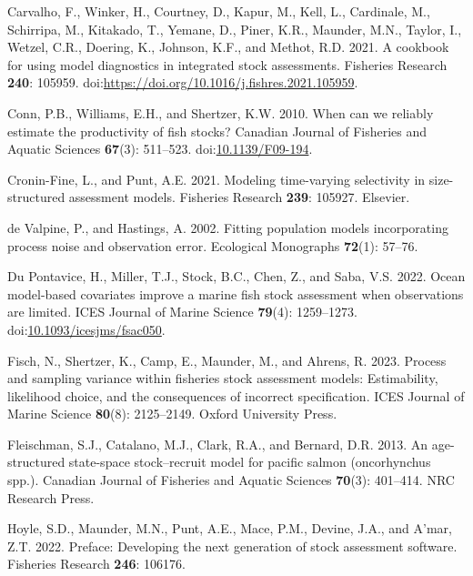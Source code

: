 \documentclass[
  12pt,
]{article}
\newlength{\cslhangindent}
\newlength{\cslentryspacingunit} %
\newenvironment{CSLReferences}[2] %
 {%
  \setlength{\parindent}{0pt}
  \ifodd #1
  \let\oldpar\par
  \def\par{\hangindent=\cslhangindent\oldpar}
  \fi
  \setlength{\parskip}{#2\cslentryspacingunit}
 }%
 {}
\begin{document}
\begin{CSLReferences}{1}{0}
\leavevmode{}%
Carvalho, F., Winker, H., Courtney, D., Kapur, M., Kell, L., Cardinale,
M., Schirripa, M., Kitakado, T., Yemane, D., Piner, K.R., Maunder, M.N.,
Taylor, I., Wetzel, C.R., Doering, K., Johnson, K.F., and Methot, R.D.
2021. A cookbook for using model diagnostics in integrated stock
assessments. Fisheries Research \textbf{240}: 105959.
doi:\url{https://doi.org/10.1016/j.fishres.2021.105959}.

\leavevmode{}%
Conn, P.B., Williams, E.H., and Shertzer, K.W. 2010. When can we
reliably estimate the productivity of fish stocks? Canadian Journal of
Fisheries and Aquatic Sciences \textbf{67}(3): 511--523.
doi:\href{https://doi.org/10.1139/F09-194}{10.1139/F09-194}.

\leavevmode{}%
Cronin-Fine, L., and Punt, A.E. 2021. Modeling time-varying selectivity
in size-structured assessment models. Fisheries Research \textbf{239}:
105927. Elsevier.

\leavevmode{}%
de Valpine, P., and Hastings, A. 2002. Fitting population models
incorporating process noise and observation error. Ecological Monographs
\textbf{72}(1): 57--76.

\leavevmode{}%
Du Pontavice, H., Miller, T.J., Stock, B.C., Chen, Z., and Saba, V.S.
2022. Ocean model-based covariates improve a marine fish stock
assessment when observations are limited. ICES Journal of Marine Science
\textbf{79}(4): 1259--1273.
doi:\href{https://doi.org/10.1093/icesjms/fsac050}{10.1093/icesjms/fsac050}.

\leavevmode{}%
Fisch, N., Shertzer, K., Camp, E., Maunder, M., and Ahrens, R. 2023.
Process and sampling variance within fisheries stock assessment models:
Estimability, likelihood choice, and the consequences of incorrect
specification. ICES Journal of Marine Science \textbf{80}(8):
2125--2149. Oxford University Press.

\leavevmode{}%
Fleischman, S.J., Catalano, M.J., Clark, R.A., and Bernard, D.R. 2013.
An age-structured state-space stock--recruit model for pacific salmon
(oncorhynchus spp.). Canadian Journal of Fisheries and Aquatic Sciences
\textbf{70}(3): 401--414. NRC Research Press.

\leavevmode{}%
Hoyle, S.D., Maunder, M.N., Punt, A.E., Mace, P.M., Devine, J.A., and
A'mar, Z.T. 2022. Preface: Developing the next generation of stock
assessment software. Fisheries Research \textbf{246}: 106176.


\end{CSLReferences}
\end{document}
